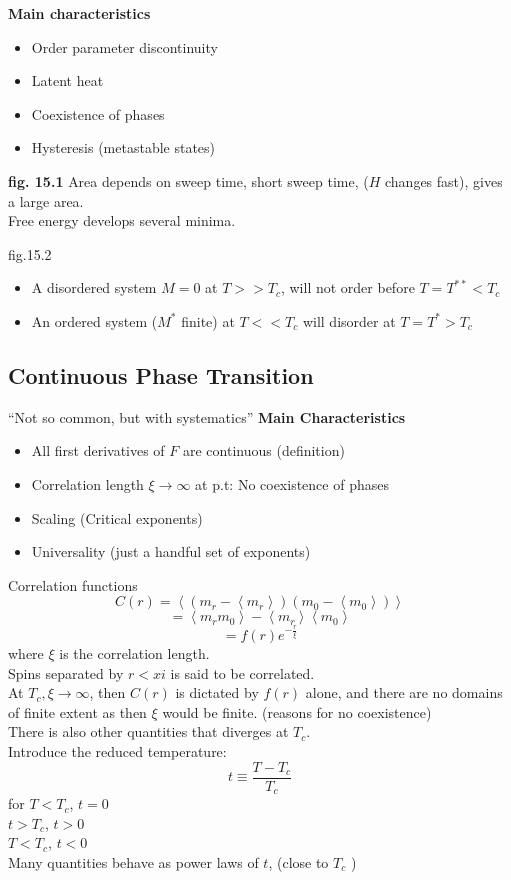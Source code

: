 \documentclass[11pt]{book}
\theoremstyle{definition}
\begin{document}
\textbf{Main characteristics} 
\begin{itemize}
	\item Order parameter discontinuity
	\item Latent heat
	\item Coexistence of phases
	\item Hysteresis (metastable states)
\end{itemize}
{\color{red} \textbf{fig. 15.1}  } 
Area depends on sweep time, short sweep time, ($ H $ changes fast), gives a large area. \\
Free energy develops several minima.

{\color{red} fig.15.2 } 
\begin{itemize}
	\item A disordered system $ M=0 $ at $ T >> T_c $, will not order before $ T=T^{**} < T_c$ 
	\item An ordered system ($M^{*}$ finite) at $ T << T_c $ will disorder at $ T=T^{*} > T_c $ 
\end{itemize}

\subsection{Continuous Phase Transition}
``Not so common, but with systematics'' 
\textbf{Main Characteristics}
\begin{itemize}
	\item All first derivatives of $ F $ are continuous (definition)
	\item Correlation length $ \xi \to \infty  $ at p.t: No coexistence of phases
	\item Scaling (Critical exponents)
	\item Universality (just a handful set of exponents)
\end{itemize}

Correlation functions
\[ C(r) = \left \langle \left( m_r - \left \langle m_r \right \rangle  \right) \left( m_0-\left \langle m_0 \right \rangle  \right)  \right \rangle  \] 
\[ = \left \langle m_r m_0 \right \rangle - \left \langle m_r \right \rangle \left \langle m_0 \right \rangle  \] 
\[ = f(r) e^{-\frac{r}{\xi}} \] 
where $ \xi $ is the correlation length. \\
Spins separated by $ r < xi $ is said to be correlated. \\
At $ T_c, \xi \to \infty $, then $ C(r) $ is dictated by $ f(r) $ alone, and there are no domains of finite extent as then $ \xi $ would be finite. (reasons for no coexistence) \\
There is also other quantities that diverges at $ T_c $. \\
Introduce the reduced temperature:
\[ t \equiv \frac{T-T_c}{T_c} \] 
for $ T < T_c $, $ t=0 $ \\
$ t > T_c $, $ t>0 $ \\
$ T<T_c $, $ t<0 $ \\
Many quantities behave as power laws of $ t $, (close to $ T_c $ )
\end{document}
